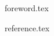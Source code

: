 \frontmatter
{foreword.tex}
\newpage
\setcounter{tocdepth}{1}
\tableofcontents
\mainmatter

\appendix
{reference.tex}
